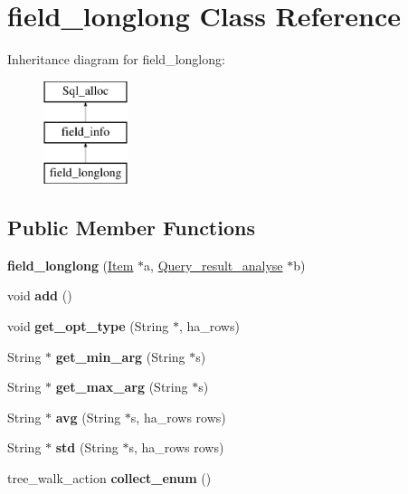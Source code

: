 \hypertarget{classfield__longlong}{}\section{field\+\_\+longlong Class Reference}
\label{classfield__longlong}
Inheritance diagram for field\+\_\+longlong\+:\begin{figure}[H]
\begin{center}
\leavevmode
\includegraphics[height=3.000000cm]{classfield__longlong}
\end{center}
\end{figure}
\subsection*{Public Member Functions}
\begin{DoxyCompactItemize}
\item 
\mbox{\label{classfield__longlong_a92dcb99179f09112f5a368c0c186f77e}} 
{\bfseries field\+\_\+longlong} (\mbox{\hyperlink{classItem}{Item}} $\ast$a, \mbox{\hyperlink{classQuery__result__analyse}{Query\+\_\+result\+\_\+analyse}} $\ast$b)
\item 
\mbox{\label{classfield__longlong_a876465b72e27b045cfb4993584ab884c}} 
void {\bfseries add} ()
\item 
\mbox{\label{classfield__longlong_a6184d2ed2905509df0936517dc8bd25b}} 
void {\bfseries get\+\_\+opt\+\_\+type} (String $\ast$, ha\+\_\+rows)
\item 
\mbox{\label{classfield__longlong_a7ad3366eda7d88e797b477fc6361b39b}} 
String $\ast$ {\bfseries get\+\_\+min\+\_\+arg} (String $\ast$s)
\item 
\mbox{\label{classfield__longlong_ad8532f0683ff4fdbef1e32ff0850bbdd}} 
String $\ast$ {\bfseries get\+\_\+max\+\_\+arg} (String $\ast$s)
\item 
\mbox{\label{classfield__longlong_aeecc77065f7db26ca2b41e467d97f6cc}} 
String $\ast$ {\bfseries avg} (String $\ast$s, ha\+\_\+rows rows)
\item 
\mbox{\label{classfield__longlong_a3a1930bb384fcc04ad3fec12789c72ed}} 
String $\ast$ {\bfseries std} (String $\ast$s, ha\+\_\+rows rows)
\item 
\mbox{\label{classfield__longlong_afe6fcaf19f09513d6987e5dffa647476}} 
tree\+\_\+walk\+\_\+action {\bfseries collect\+\_\+enum} ()
\end{DoxyCompactItemize}
